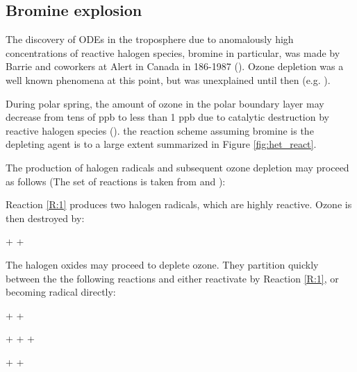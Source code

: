 \subsection{Bromine explosion}\label{sec:BE}

The discovery of ODEs in the troposphere due to anomalously high concentrations of reactive halogen species, bromine in particular, was made by Barrie and coworkers at Alert in Canada in 186-1987 (\cite{BARRIE1986643}). Ozone depletion was a well known phenomena at this point, but was unexplained until then (e.g. \cite{Oltmans1981}). 

\medskip

During polar spring, the amount of ozone in the polar boundary layer may decrease from tens of ppb to less than 1 ppb due to catalytic destruction by reactive halogen species (\cite{CAO}). the reaction scheme assuming bromine is the depleting agent is to a large extent summarized in Figure \ref{fig:het_react}. 

\medskip



The production of halogen radicals and subsequent ozone depletion may proceed as follows (The set of reactions is taken from \cite{CAO} and \cite{Simpson2015}): 

\medskip

Reaction \ref{R:1} produces two halogen radicals, which are highly reactive. Ozone is then destroyed by: 

\begin{reaction}
     +  \rightarrow {} + 
    \label{R:2}
\end{reaction}

The halogen oxides may proceed to deplete ozone. They partition quickly between the the following reactions and either reactivate by Reaction \ref{R:1}, or becoming radical directly:


\begin{reaction}
     +  \rightarrow {} +  \label{R:3} 
\end{reaction}


\begin{reaction}
     +  \rightarrow {} +  +  \label{R:4} 
\end{reaction}


\begin{reaction}
     +  \rightarrow {} +  \label{R:5} 
\end{reaction}


